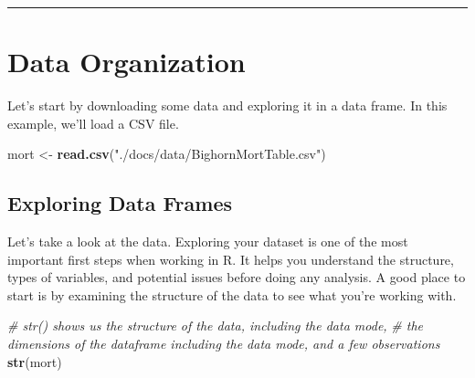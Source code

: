 \documentclass[
]{book}
\newenvironment{Shaded}{\begin{snugshade}}{\end{snugshade}}
\newcommand{\CommentTok}[1]{\textcolor[rgb]{0.56,0.35,0.01}{\textit{#1}}}
\newcommand{\FunctionTok}[1]{\textcolor[rgb]{0.13,0.29,0.53}{\textbf{#1}}}
\newcommand{\NormalTok}[1]{#1}
\newcommand{\OtherTok}[1]{\textcolor[rgb]{0.56,0.35,0.01}{#1}}
\newcommand{\StringTok}[1]{\textcolor[rgb]{0.31,0.60,0.02}{#1}}
\begin{document}
\begin{center}\rule{0.5\linewidth}{0.5pt}\end{center}

\chapter{Data Organization}\label{data-org}

Let's start by downloading some data and exploring it in a data frame. In this example, we'll load a CSV file.

\begin{Shaded}
\begin{Highlighting}[]
\NormalTok{mort }\OtherTok{\textless{}{-}} \FunctionTok{read.csv}\NormalTok{(}\StringTok{"./docs/data/BighornMortTable.csv"}\NormalTok{)}
\end{Highlighting}
\end{Shaded}

\section{Exploring Data Frames}\label{exploring-data-frames}

Let's take a look at the data. Exploring your dataset is one of the most important first steps when working in R. It helps you understand the structure, types of variables, and potential issues before doing any analysis. A good place to start is by examining the structure of the data to see what you're working with.

\begin{Shaded}
\begin{Highlighting}[]
\CommentTok{\# str() shows us the structure of the data, including the data mode, }
\CommentTok{\# the dimensions of the dataframe including the data mode, and a few observations}
\FunctionTok{str}\NormalTok{(mort)  }
\end{Highlighting}
\end{Shaded}
\end{document}
